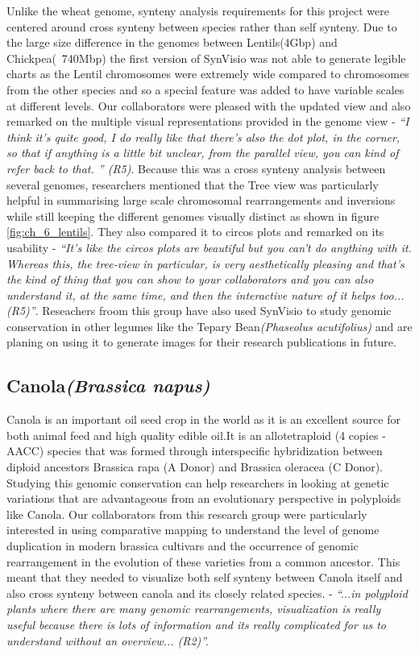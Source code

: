 Unlike the wheat genome, synteny analysis requirements for this project were centered around cross synteny between species rather than self synteny. Due to the large size difference in the genomes between Lentils(4Gbp) and Chickpea(~740Mbp) the first version of SynVisio was not able to generate legible charts as the Lentil chromosomes were extremely wide compared to chromosomes from the other species and so a special feature was added to have variable scales at different levels. Our collaborators were pleased with the updated view and also remarked on the multiple visual representations provided in the genome view - \textit{``I think it's quite good, I do really like that there's also the dot plot, in the corner, so that if anything is a little bit unclear, from the parallel view, you can kind of refer back to that.
'' (R5)}. Because this was a cross synteny analysis between several genomes, researchers mentioned that the Tree view was particularly helpful in summarising large scale chromosomal rearrangements and inversions while still keeping the different genomes visually distinct as shown in figure \ref{fig:ch_6_lentils}. They also compared it to circos plots and remarked on its usability - \textit{``It's like the circos plots are beautiful but you can't do anything with it. Whereas this, the tree-view in particular, is very aesthetically pleasing and that's the kind of thing that you can show to your collaborators and you can also understand it, at the same time, and then the interactive nature of it helps too...
(R5)''}. Reseachers froom this group have also used SynVisio to study genomic conservation in other legumes like the Tepary Bean\textit{(Phaseolus acutifolius)} and are planing on using it to generate images for their research publications in future.

\subsection{Canola\textit{(Brassica napus)}}
Canola is an important oil seed crop in the world as it is an excellent source for both animal feed and high quality edible oil\cite{shahidi1990canola}.It is an allotetraploid (4 copies - AACC) species that was formed through interspecific hybridization between diploid ancestors Brassica rapa (A Donor) and Brassica oleracea (C Donor)\cite{parkin1995identification}. Studying this genomic conservation can help researchers in looking at genetic variations that are advantageous from an evolutionary perspective in polyploids like Canola. Our collaborators from this research group were particularly interested in using comparative mapping to understand the level of genome duplication in modern brassica cultivars and the occurrence of genomic rearrangement in the evolution of these varieties from a common ancestor. This meant that they needed to visualize both self synteny between Canola itself and also cross synteny between canola and its closely related species. - \textit{``...in polyploid plants where there are many genomic rearrangements, visualization is really useful because there is lots of information and its really complicated for us to understand without an overview... (R2)''.}

